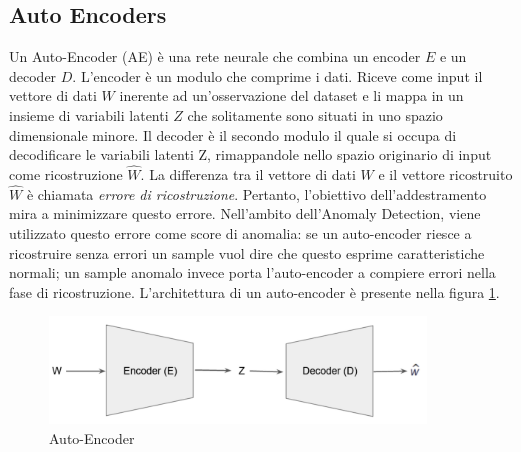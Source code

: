 \subsection{Auto Encoders}
Un Auto-Encoder (AE) è una rete neurale che combina un encoder $E$ e un decoder $D$. L'encoder è un modulo che comprime i dati. Riceve come input il vettore di dati $W$ inerente ad un'osservazione del dataset e li mappa in un insieme di variabili latenti $Z$ che solitamente sono situati in uno spazio dimensionale minore. Il decoder è il secondo modulo il quale si occupa di decodificare le variabili latenti Z, rimappandole nello spazio originario di input come ricostruzione $\widehat{W}$. La differenza tra il vettore di dati $W$ e il vettore ricostruito $\widehat{W}$ è chiamata \textit{errore di ricostruzione}. Pertanto, l'obiettivo dell'addestramento mira a minimizzare questo errore. Nell'ambito dell'Anomaly Detection, viene utilizzato questo errore come score di anomalia: se un auto-encoder riesce a ricostruire senza errori un sample vuol dire che questo esprime caratteristiche normali; un sample anomalo invece porta l'auto-encoder a compiere errori nella fase di ricostruzione. L'architettura di un auto-encoder è presente nella figura \ref{ae}.
\begin{figure}[t]
	\centering
	\includegraphics[width=10cm, scale=1]{images/ae}
	\caption{Auto-Encoder}
	\label{ae}
\end{figure}
